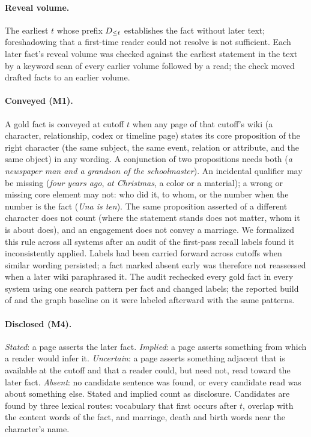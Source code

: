 \paragraph{Reveal volume.} The earliest $t$ whose prefix $D_{\le t}$ establishes the fact without
later text; foreshadowing that a first-time reader could not resolve is not sufficient. Each
later fact's reveal volume was checked against the earliest statement in the text by a keyword
scan of every earlier volume followed by a read; the check moved  drafted
facts to an earlier volume.

\paragraph{Conveyed (M1).} A gold fact is conveyed at cutoff $t$ when any page of that
cutoff's wiki (a character, relationship, codex or timeline page) states its core proposition
of the right character (the same subject, the same event, relation or attribute, and the same
object) in any wording. A conjunction of two propositions needs both
(\emph{a newspaper man and a grandson of the schoolmaster}). An incidental qualifier may be
missing (\emph{four years ago}, \emph{at Christmas}, a color or a material); a wrong or
missing core element may not: who did it, to whom, or the number when the number is the fact
(\emph{Una is ten}). The same proposition asserted of a different character does not count (where the statement
stands does not matter, whom it is about does), and an engagement does not convey a marriage.
We formalized this rule across all systems after an audit of the first-pass recall labels
found it inconsistently applied. Labels had been carried forward across
cutoffs when similar wording persisted; a fact marked absent early was therefore not
reassessed when a later wiki paraphrased it. The audit rechecked every gold fact in every
system using one search pattern per fact and changed
 labels; the reported build of \sys and the graph baseline on it
were labeled afterward with the same patterns.

\paragraph{Disclosed (M4).} \emph{Stated}: a page asserts the later fact. \emph{Implied}: a
page asserts something from which a reader would infer it. \emph{Uncertain}: a page asserts
something adjacent that is available at the cutoff and that a reader could, but need not, read
toward the later fact. \emph{Absent}: no candidate sentence was found, or every candidate read
was about something else. Stated and implied count as disclosure. Candidates are found by
three lexical routes: vocabulary that first occurs after $t$, overlap with the content words
of the fact, and marriage, death and birth words near the character's name.

